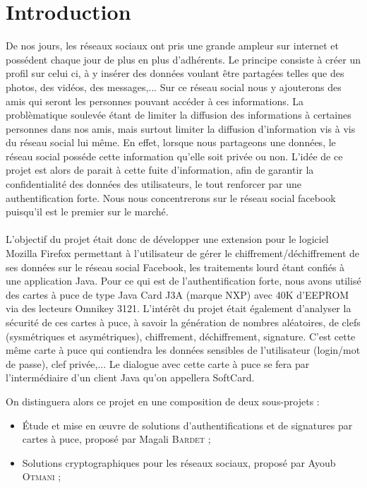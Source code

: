 \documentclass[a4paper,11pt,french]{article}
\begin{document}
\makeFirstPage
\clearpage


\section{Introduction}
\renewcommand\labelitemi{\textbullet} %
\renewcommand\labelitemii{$\circ$} %
De nos jours, les réseaux sociaux ont pris une grande ampleur sur internet
et possédent chaque jour de plus en plus d'adhérents. Le principe consiste à créer
un profil sur celui ci, à y insérer des données voulant être partagées telles que des
photos, des vidéos, des messages,... Sur ce réseau social nous y ajouterons des amis
qui seront les personnes pouvant accéder à ces informations. 
La problèmatique soulevée étant de limiter la diffusion des informations à certaines personnes
dans nos amis, mais surtout limiter la diffusion d'information vis à vis du réseau social lui même.
En effet, lorsque nous partageons une données, le réseau social posséde cette information qu'elle soit privée
ou non. L'idée de ce projet est alors de parait à cette fuite d'information, afin de garantir la confidentialité
des données des utilisateurs, le tout renforcer par une authentification forte. Nous nous concentrerons sur 
le réseau social facebook puisqu'il est le premier sur le marché.


\paragraph{}
L'objectif du projet était donc de développer une extension pour le logiciel Mozilla 
Firefox permettant à l’utilisateur de gérer le chiffrement/déchiffrement de ses données sur 
le réseau social Facebook, les traitements lourd étant confiés à une application Java.
Pour ce qui est de l’authentification forte, nous avons utilisé des cartes à puce
de type Java Card J3A (marque NXP) avec 40K d'EEPROM via des lecteurs Omnikey 3121. 
L'intérêt du projet était également d'analyser la sécurité de ces cartes à puce, à savoir la génération
de nombres aléatoires, de clefs (sysmétriques et asymétriques), chiffrement, déchiffrement, signature.
C'est cette même carte à puce qui contiendra les données sensibles de l’utilisateur (login/mot de passe), clef privée,...
Le dialogue avec cette carte à puce se fera par l’intermédiaire d’un client Java qu'on appellera SoftCard. 


On distinguera alors ce projet en une composition de deux sous-projets :
\begin{itemize}
    \item Étude et mise en \oe{}uvre de solutions d’authentifications et de signatures 
        par cartes à puce, proposé par Magali \textsc{Bardet} ;
\item Solutions cryptographiques pour les réseaux sociaux, proposé par Ayoub 
    \textsc{Otmani} ;
\end{itemize}
\end{document}
